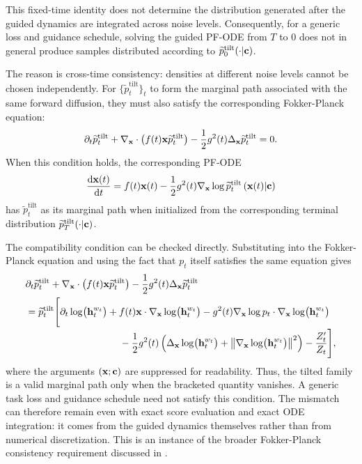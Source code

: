 This fixed-time identity does not determine the distribution generated after
the guided dynamics are integrated across noise levels. Consequently, for a
generic loss and guidance schedule, solving the guided PF-ODE from $T$ to $0$
does not in general produce samples distributed according to
$\widetilde p_0^{\mathrm{tilt}}(\cdot|{\mathbf{c}})$.

The reason is cross-time consistency: densities at different noise levels
cannot be chosen independently. For
$\{\widetilde p_t^{\mathrm{tilt}}\}_t$ to form the marginal path associated
with the same forward diffusion, they must also satisfy the corresponding
Fokker-Planck equation:
\[
\partial_t \widetilde p_t^{\mathrm{tilt}}
+
\nabla_{{\mathbf{x}}} \cdot
\bigl(f(t){\mathbf{x}} \widetilde p_t^{\mathrm{tilt}}\bigr)
-
\frac{1}{2}g^2(t)
\Delta_{{\mathbf{x}}}\widetilde p_t^{\mathrm{tilt}}
=
0.
\]
When this condition holds, the corresponding PF-ODE
\[
\frac{\mathop{}\!\mathrm{d}{\mathbf{x}}(t)}{\mathop{}\!\mathrm{d} t}
=
f(t){\mathbf{x}}(t)
-
\frac{1}{2}g^2(t)
\nabla_{{\mathbf{x}}}\log
\widetilde p_t^{\mathrm{tilt}}\left({\mathbf{x}}(t)|{\mathbf{c}}\right)
\]
has $\widetilde p_t^{\mathrm{tilt}}$ as its marginal path when initialized from
the corresponding terminal distribution
$\widetilde p_T^{\mathrm{tilt}}(\cdot|{\mathbf{c}})$.


The compatibility condition can be checked directly. Substituting
 into the Fokker-Planck equation and using
the fact that $p_t$ itself satisfies the same equation gives
\begin{align*}
&
\partial_t \widetilde p_t^{\mathrm{tilt}}
+
\nabla_{\rvx} \cdot
\bigl(f(t)\rvx \widetilde p_t^{\mathrm{tilt}}\bigr)
-
\frac{1}{2}g^2(t)
\Delta_{\rvx}\widetilde p_t^{\mathrm{tilt}}
\\
&=
\widetilde p_t^{\mathrm{tilt}}
\Bigg[
\partial_t
\log \bigl(\rvh_t^{ w_t}\bigr)
+
f(t)\rvx\cdot
\nabla_{\rvx}\log \bigl(\rvh_t^{ w_t}\bigr)
-
g^2(t)
\nabla_{\rvx}\log p_t
\cdot
\nabla_{\rvx}\log \bigl(\rvh_t^{ w_t}\bigr)
\\[-2pt]
&\hspace{3.4cm}
-
\frac{1}{2}g^2(t)
\left(
\Delta_{\rvx}\log \bigl(\rvh_t^{ w_t}\bigr)
+
\left\|
\nabla_{\rvx}\log \bigl(\rvh_t^{ w_t}\bigr)
\right\|^2
\right)
-
\frac{Z_t'}{Z_t}
\Bigg],
\end{align*}
where the arguments $({\mathbf{x}};{\mathbf{c}})$ are suppressed for readability.
Thus, the tilted family is a valid marginal path only when the bracketed
quantity vanishes. A generic task loss and guidance schedule need not satisfy
this condition. The mismatch can therefore remain even with exact score
evaluation and exact ODE integration: it comes from the guided dynamics
themselves rather than from numerical discretization. This is an instance of
the broader Fokker-Planck consistency requirement discussed in
\citep{lai2023fp}.

